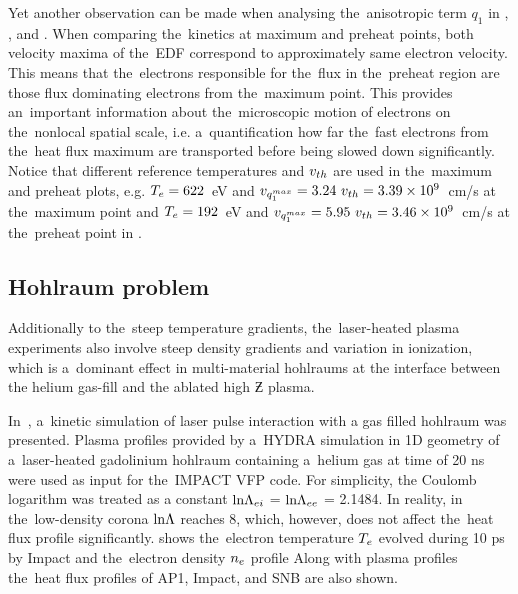 Yet another observation can be made when analysing the~anisotropic term $q_1$ 
in , , and 
. When comparing the~kinetics at maximum and 
preheat points, both velocity maxima of the~EDF correspond to approximately 
same electron velocity. This means that the~electrons responsible for 
the~flux in the~preheat region are those flux dominating electrons 
from the~maximum point. This provides an~important information
about the~microscopic motion of electrons on the~nonlocal spatial scale, i.e. 
a~quantification how far the~fast electrons from the~heat flux maximum 
are transported before being slowed down significantly. 
Notice that different reference temperatures and $v_{th}$ are used 
in the~maximum and preheat plots, 
e.g. $T_e = 622$~eV and $v_{q_1^{max}} = 3.24~v_{th} = 3.39\times10^9$~cm/s 
at the~maximum point and $T_e = 192$~eV and 
$v_{q_1^{max}} = 5.95~v_{th} = 3.46\times10^9$~cm/s at the~preheat point
in .

 %

\subsection{Hohlraum problem}
Additionally to the~steep temperature gradients, the~laser-heated plasma 
experiments also involve steep density gradients and variation in ionization,
which is a~dominant effect in multi-material hohlraums
at the interface between the helium gas-fill and 
the ablated high $\Zbar$ plasma.

In~\cite{Brodrick_PoP2017}, a~kinetic simulation of laser pulse interaction 
with a gas filled hohlraum was presented. 
Plasma profiles provided by a~HYDRA simulation in 1D
geometry of a~laser-heated gadolinium hohlraum containing a~helium 
gas at time of 20 ns were used as input for the~IMPACT 
\cite{Kingham_JCP2004} VFP code.  
For simplicity, the Coulomb logarithm was treated as a
constant $\text{ln}\Lambda_{ei}$ = $\text{ln}\Lambda_{ee}$ = 2.1484. In reality, in the~low-density 
corona $\text{ln}\Lambda$ reaches 8, which, however, does not affect the~heat flux profile 
significantly. 
 shows the~electron temperature $T_e$ 
evolved during 10 ps by Impact and the~electron density $n_e$ profile
Along with plasma profiles the~heat flux profiles
of AP1, Impact, and SNB are also shown. 


